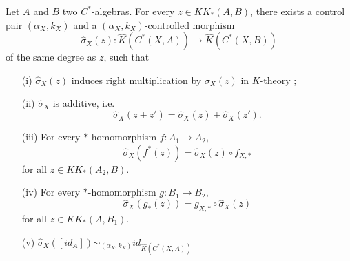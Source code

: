 \begin{prop}\label{Roe2}
Let $A$ and $B$ two $C^*$-algebras. For every $z\in KK_*(A,B)$, there exists a control pair $(\alpha_X,k_X)$ and a $(\alpha_X,k_X)$-controlled morphism
\[\hat\sigma_X(z) : \hat K(C^*(X,A))\rightarrow \hat K(C^*(X,B))\]
of the same degree as $z$, such that
\begin{enumerate}
\item[(i)] $\hat\sigma_X(z)$ induces right multiplication by $\sigma_X(z)$ in $K$-theory ;
\item[(ii)] $\hat\sigma_X$ is additive, i.e.
\[\hat\sigma_X(z+z')=\hat\sigma_X(z)+\hat\sigma_X(z').\]
\item[(iii)] For every $*$-homomorphism $f : A_1\rightarrow A_2$,
\[\hat\sigma_X(f^*(z))=\hat\sigma_X(z)\circ f_{X,*}\] for all $z\in KK_*(A_2,B)$.
\item[(iv)] For every $*$-homomorphism $g : B_1\rightarrow B_2$,
\[\hat\sigma_X(g_*(z))= g_{X,*}\circ \hat\sigma_X(z)\] for all $z\in KK_*(A,B_1)$.
\item[(v)] $\hat\sigma_X([id_A]) \sim_{(\alpha_X,k_X)} id_{\hat K(C^*(X,A))}$
\end{enumerate}
\end{prop}

